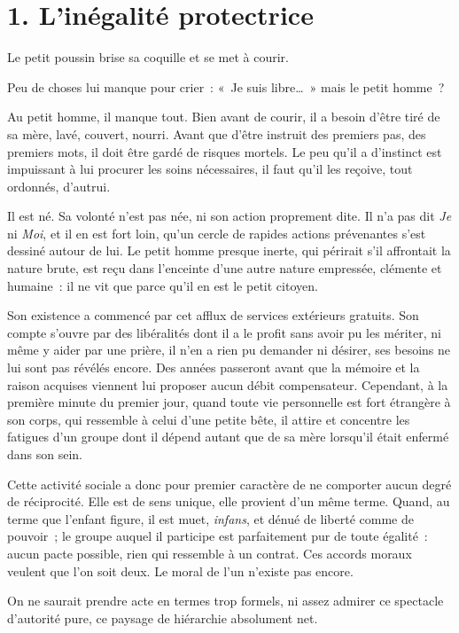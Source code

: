 \documentclass[french,twoside]{book} %
\begin{document}
\section[{1. L’inégalité protectrice}]{1. L’inégalité protectrice}
\noindent Le petit poussin brise sa coquille et se met à courir.\par
Peu de choses lui manque pour crier : « Je suis libre… » mais le petit homme ?\par
Au petit homme, il manque tout. Bien avant de courir, il a besoin d’être tiré de sa mère, lavé, couvert, nourri. Avant que d’être instruit des premiers pas, des premiers mots, il doit être gardé de risques mortels. Le peu qu’il a d’instinct est impuissant à lui procurer les soins nécessaires, il faut qu’il les reçoive, tout ordonnés, d’autrui.\par
Il est né. Sa volonté n’est pas née, ni son action proprement dite. Il n’a pas dit \emph{Je} ni \emph{Moi}, et il en est fort loin, qu’un cercle de rapides actions prévenantes s’est dessiné autour de lui. Le petit homme presque inerte, qui périrait s’il affrontait la nature brute, est reçu dans l’enceinte d’une autre nature empressée, clémente et humaine : il ne vit que parce qu’il en est le petit citoyen.\par
Son existence a commencé par cet afflux de services extérieurs gratuits. Son compte s’ouvre par des libéralités dont il a le profit sans avoir pu les mériter, ni même y aider par une prière, il n’en a rien pu demander ni désirer, ses besoins ne lui sont pas révélés encore. Des années passeront avant que la mémoire et la raison acquises viennent lui proposer aucun débit compensateur. Cependant, à la première minute du premier jour, quand toute vie personnelle est fort étrangère à son corps, qui ressemble à celui d’une petite bête, il attire et concentre les fatigues d’un groupe dont il dépend autant que de sa mère lorsqu’il était enfermé dans son sein.\par
Cette activité sociale a donc pour premier caractère de ne comporter aucun degré de réciprocité. Elle est de sens unique, elle provient d’un même terme. Quand, au terme que l’enfant figure, il est muet, \emph{infans}, et dénué de liberté comme de pouvoir ; le groupe auquel il participe est parfaitement pur de toute égalité : aucun pacte possible, rien qui ressemble à un contrat. Ces accords moraux veulent que l’on soit deux. Le moral de l’un n’existe pas encore.\par
On ne saurait prendre acte en termes trop formels, ni assez admirer ce spectacle d’autorité pure, ce paysage de hiérarchie absolument net.\par
\end{document}
